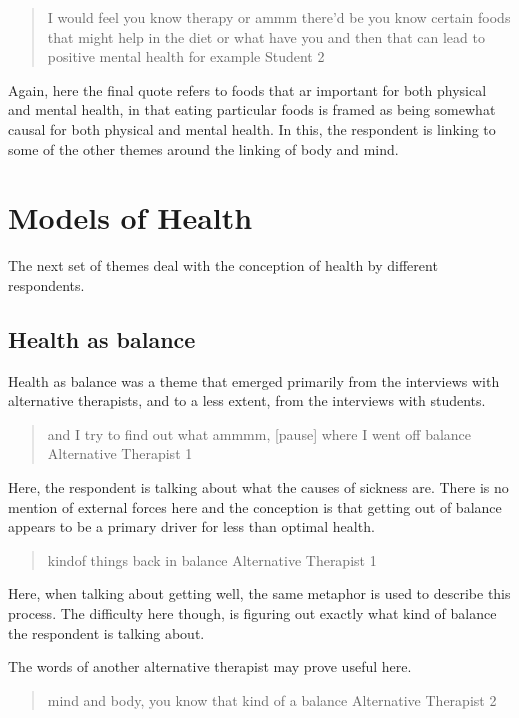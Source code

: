 \begin{quotation}
   I would feel you know therapy or ammm there'd be you know certain foods that might help in the diet or what have you and then that can lead to positive mental health for example
Student 2
\end{quotation}

Again, here the final quote refers to foods that ar important for both physical and mental health, in that eating particular foods is framed as being somewhat causal for both physical and mental health. In this, the respondent is linking to some of the other themes around the linking of body and mind. 

\section{Models of Health}
\label{sec:models-health}

The next set of themes deal with the conception of health by different respondents. 

\subsection{Health as balance}
\label{sec:health-as-balance}

Health as balance was a theme that emerged primarily from the interviews with alternative therapists, and to a less extent, from the interviews with students. 

\begin{quotation}
  and I try to find out what ammmm, [pause] where I went off balance 
Alternative Therapist 1
\end{quotation}

Here, the respondent is talking about what the causes of sickness are. There is no mention of external forces here and the conception is that getting out of balance appears to be a primary driver for less than optimal health. 

\begin{quotation}
  kindof things back in balance
Alternative Therapist 1
\end{quotation}

Here, when talking about getting well, the same metaphor is used to describe this process. The difficulty here though, is figuring out exactly what kind of balance the respondent is talking about. 

The words of another alternative therapist may prove useful here. 
\begin{quotation}
  mind and body, you know that kind of a balance 
Alternative Therapist 2
\end{quotation}

